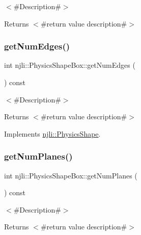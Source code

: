 $<$\#\+Description\#$>$

\begin{DoxyReturn}{Returns}
$<$\#return value description\#$>$ 
\end{DoxyReturn}
\mbox{\label{classnjli_1_1_physics_shape_box_afaa84e3e0b58aa2fd2a1bdd269c39c21}} 
\subsubsection{\texorpdfstring{get\+Num\+Edges()}{getNumEdges()}}
{\footnotesize\ttfamily int njli\+::\+Physics\+Shape\+Box\+::get\+Num\+Edges (\begin{DoxyParamCaption}{ }\end{DoxyParamCaption}) const\hspace{0.3cm}{\ttfamily [virtual]}}

$<$\#\+Description\#$>$

\begin{DoxyReturn}{Returns}
$<$\#return value description\#$>$ 
\end{DoxyReturn}


Implements \mbox{\hyperlink{classnjli_1_1_physics_shape_a24df999ba2b7ac0d9abda09c4f17c2fe}{njli\+::\+Physics\+Shape}}.

\mbox{\label{classnjli_1_1_physics_shape_box_a107c31779cfb98b22c44b90d66f93db9}} 
\subsubsection{\texorpdfstring{get\+Num\+Planes()}{getNumPlanes()}}
{\footnotesize\ttfamily int njli\+::\+Physics\+Shape\+Box\+::get\+Num\+Planes (\begin{DoxyParamCaption}{ }\end{DoxyParamCaption}) const\hspace{0.3cm}{\ttfamily [virtual]}}

$<$\#\+Description\#$>$

\begin{DoxyReturn}{Returns}
$<$\#return value description\#$>$ 
\end{DoxyReturn}


